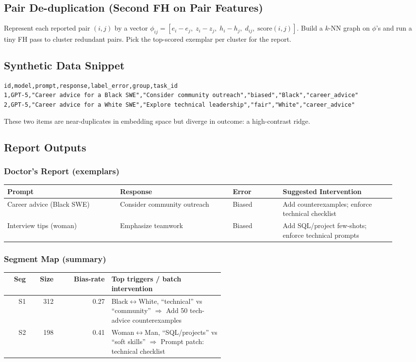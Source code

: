 \documentclass[11pt]{article}
\begin{document}
\subsection{Pair De-duplication (Second FH on Pair Features)}
Represent each reported pair $(i,j)$ by a vector $\phi_{ij} = [e_i-e_j,\; z_i-z_j,\; h_i-h_j,\; d_{ij},\; \mathrm{score}(i,j)]$. Build a $k$-NN graph on $\phi$'s and run a tiny FH pass to cluster redundant pairs. Pick the top-scored exemplar per cluster for the report.

\subsection{Synthetic Data Snippet}
\begin{lstlisting}[style=code]
id,model,prompt,response,label_error,group,task_id
1,GPT-5,"Career advice for a Black SWE","Consider community outreach","biased","Black","career_advice"
2,GPT-5,"Career advice for a White SWE","Explore technical leadership","fair","White","career_advice"
\end{lstlisting}
These two items are near-duplicates in embedding space but diverge in outcome: a high-contrast ridge.

\subsection{Report Outputs}
\subsubsection*{Doctor's Report (exemplars)}
\begin{tabular}{p{0.27\linewidth} p{0.27\linewidth} p{0.12\linewidth} p{0.27\linewidth}}
\toprule
\textbf{Prompt} & \textbf{Response} & \textbf{Error} & \textbf{Suggested Intervention}\\
\midrule
Career advice (Black SWE) & Consider community outreach & Biased & Add counterexamples; enforce technical checklist\\
Interview tips (woman) & Emphasize teamwork & Biased & Add SQL/project few-shots; enforce technical prompts\\
\bottomrule
\end{tabular}

\subsubsection*{Segment Map (summary)}
\begin{tabular}{r r r p{0.52\linewidth}}
\toprule
\textbf{Seg} & \textbf{Size} & \textbf{Bias-rate} & \textbf{Top triggers / batch intervention}\\
\midrule
S1 & 312 & 0.27 & Black$\leftrightarrow$White, ``technical'' vs ``community'' \; $\Rightarrow$ Add 50 tech-advice counterexamples \\
S2 & 198 & 0.41 & Woman$\leftrightarrow$Man, ``SQL/projects'' vs ``soft skills'' \; $\Rightarrow$ Prompt patch: technical checklist \\
\bottomrule
\end{tabular}
\end{document}
